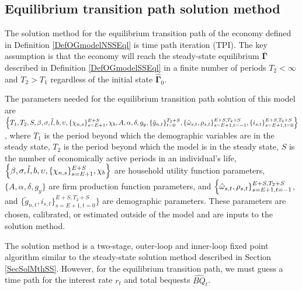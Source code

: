 \documentclass[letterpaper,12pt]{article}
\theoremstyle{definition}
\begin{document}
  \subsection{Equilibrium transition path solution method}\label{SecSolMthTP}

    The solution method for the equilibrium transition path of the economy defined in Definition \ref{DefOGmodelNSSEql} is time path iteration (TPI). The key assumption is that the economy will reach the steady-state equilibrium $\bm{\bar{\Gamma}}$ described in Definition \ref{DefOGmodelSSEql} in a finite number of periods $T_2<\infty$ and $T_2>T_1$ regardless of the initial state $\bm{\hat{\Gamma}}_0$.

    The parameters needed for the equilibrium transition path solution of this model are $\Bigl\{T_1, T_2, S, \beta, \sigma, \tilde{l}, b, \upsilon, \{\chi_{n,s}\}_{s=E+1}^{E+S}, \chi_b, A, \alpha, \delta, g_y, \{\tilde{g}_{n,t}\}_{t=0}^{T_2+S}, \{\hat{\omega}_{s,t},\rho_{s,t}\}_{s=E+1,t=-1}^{E+S,T_2+S},\{i_{s,t}\}_{s=E+1,t=0}^{E+S,T_2+S}\Bigr\}$, where $T_1$ is the period beyond which the demographic variables are in the steady state, $T_2$ is the period beyond which the model is in the steady state, $S$ is the number of economically active periods in an individual's life, $\Bigl\{\beta, \sigma, \tilde{l}, b, \upsilon, \{\chi_{n,s}\}_{s=E+1}^{E+S}, \chi_b\Bigr\}$ are household utility function parameters, $\{A, \alpha, \delta,g_y\}$ are firm production function parameters, and $\Bigl\{\hat{\omega}_{s,t},\rho_{s,t}\}_{s=E+1,t=-1}^{E+S,T_2+S}$, and $\{\tilde{g}_{n,t},i_{s,t}\}_{s=E+1,t=0}^{E+S,T_2+S}\Bigr\}$ are demographic parameters. These parameters are chosen, calibrated, or estimated outside of the model and are inputs to the solution method.

    The solution method is a two-stage, outer-loop and inner-loop fixed point algorithm similar to the steady-state solution method described in Section \ref{SecSolMthSS}. However, for the equilibrium transition path, we must guess a time path for the interest rate $r_t$ and total bequests $\hat{BQ}_t$.
\end{document}
